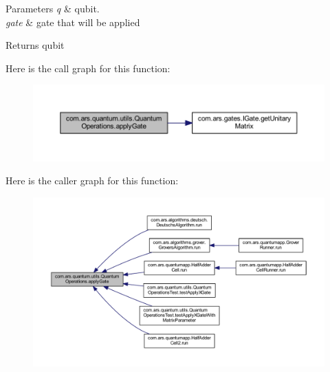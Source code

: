 \begin{DoxyParams}{Parameters}
{\em q} & qubit. \\
\hline
{\em gate} & gate that will be applied \\
\hline
\end{DoxyParams}
\begin{DoxyReturn}{Returns}
qubit 
\end{DoxyReturn}
Here is the call graph for this function\+:\nopagebreak
\begin{figure}[H]
\begin{center}
\leavevmode
\includegraphics[width=350pt]{classcom_1_1ars_1_1quantum_1_1utils_1_1_quantum_operations_a3d1e394a18ae308ebaec070e49ae8f8d_cgraph}
\end{center}
\end{figure}
Here is the caller graph for this function\+:
\nopagebreak
\begin{figure}[H]
\begin{center}
\leavevmode
\includegraphics[width=350pt]{classcom_1_1ars_1_1quantum_1_1utils_1_1_quantum_operations_a3d1e394a18ae308ebaec070e49ae8f8d_icgraph}
\end{center}
\end{figure}
\hypertarget{classcom_1_1ars_1_1quantum_1_1utils_1_1_quantum_operations_a9481454be27aa6f92182c9d635d81017}{}\label{classcom_1_1ars_1_1quantum_1_1utils_1_1_quantum_operations_a9481454be27aa6f92182c9d635d81017} 
